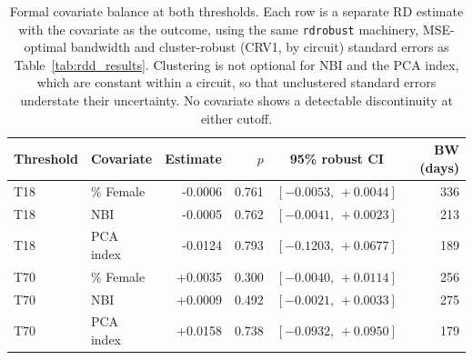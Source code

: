 \begin{table}[ht]
\centering
\caption{Formal covariate balance at both thresholds. Each row is a separate RD estimate with the covariate as the outcome, using the same \texttt{rdrobust} machinery, MSE-optimal bandwidth and cluster-robust (CRV1, by circuit) standard errors as Table~\ref{tab:rdd_results}. Clustering is not optional for NBI and the PCA index, which are constant within a circuit, so that unclustered standard errors understate their uncertainty. No covariate shows a detectable discontinuity at either cutoff.}
\label{tab:balance_formal}
\begin{tabular}{llrrcr}
\toprule
Threshold & Covariate & Estimate & $p$ & 95\% robust CI & BW (days) \\
\midrule
T18 & \% Female & -0.0006 & 0.761 & $[-0.0053,\,+0.0044]$ & 336 \\
T18 & NBI & -0.0005 & 0.762 & $[-0.0041,\,+0.0023]$ & 213 \\
T18 & PCA index & -0.0124 & 0.793 & $[-0.1203,\,+0.0677]$ & 189 \\
\midrule
T70 & \% Female & +0.0035 & 0.300 & $[-0.0040,\,+0.0114]$ & 256 \\
T70 & NBI & +0.0009 & 0.492 & $[-0.0021,\,+0.0033]$ & 275 \\
T70 & PCA index & +0.0158 & 0.738 & $[-0.0932,\,+0.0950]$ & 179 \\
\bottomrule
\end{tabular}
\end{table}
